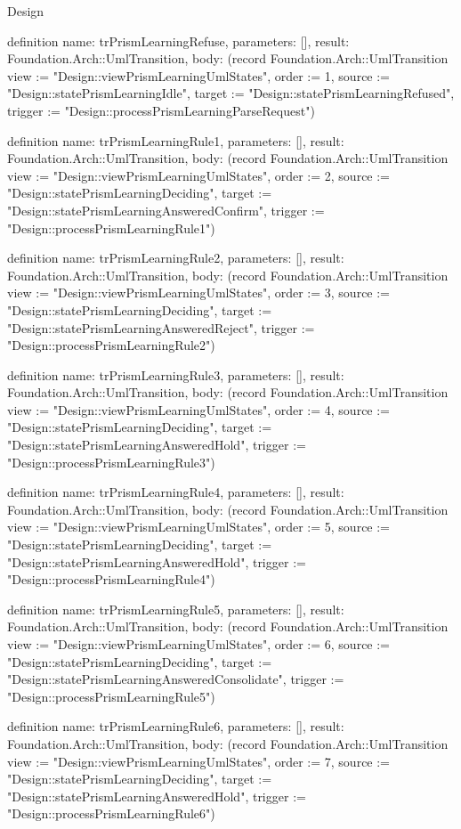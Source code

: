 \begin{lexlean}{Design}
\begin{semanticmodule}
definition{
  name: trPrismLearningRefuse,
  parameters: [],
  result: Foundation.Arch::UmlTransition,
  body: (record Foundation.Arch::UmlTransition {view := "Design::viewPrismLearningUmlStates", order := 1, source := "Design::statePrismLearningIdle", target := "Design::statePrismLearningRefused", trigger := "Design::processPrismLearningParseRequest"})
}

definition{
  name: trPrismLearningRule1,
  parameters: [],
  result: Foundation.Arch::UmlTransition,
  body: (record Foundation.Arch::UmlTransition {view := "Design::viewPrismLearningUmlStates", order := 2, source := "Design::statePrismLearningDeciding", target := "Design::statePrismLearningAnsweredConfirm", trigger := "Design::processPrismLearningRule1"})
}

definition{
  name: trPrismLearningRule2,
  parameters: [],
  result: Foundation.Arch::UmlTransition,
  body: (record Foundation.Arch::UmlTransition {view := "Design::viewPrismLearningUmlStates", order := 3, source := "Design::statePrismLearningDeciding", target := "Design::statePrismLearningAnsweredReject", trigger := "Design::processPrismLearningRule2"})
}

definition{
  name: trPrismLearningRule3,
  parameters: [],
  result: Foundation.Arch::UmlTransition,
  body: (record Foundation.Arch::UmlTransition {view := "Design::viewPrismLearningUmlStates", order := 4, source := "Design::statePrismLearningDeciding", target := "Design::statePrismLearningAnsweredHold", trigger := "Design::processPrismLearningRule3"})
}

definition{
  name: trPrismLearningRule4,
  parameters: [],
  result: Foundation.Arch::UmlTransition,
  body: (record Foundation.Arch::UmlTransition {view := "Design::viewPrismLearningUmlStates", order := 5, source := "Design::statePrismLearningDeciding", target := "Design::statePrismLearningAnsweredHold", trigger := "Design::processPrismLearningRule4"})
}

definition{
  name: trPrismLearningRule5,
  parameters: [],
  result: Foundation.Arch::UmlTransition,
  body: (record Foundation.Arch::UmlTransition {view := "Design::viewPrismLearningUmlStates", order := 6, source := "Design::statePrismLearningDeciding", target := "Design::statePrismLearningAnsweredConsolidate", trigger := "Design::processPrismLearningRule5"})
}

definition{
  name: trPrismLearningRule6,
  parameters: [],
  result: Foundation.Arch::UmlTransition,
  body: (record Foundation.Arch::UmlTransition {view := "Design::viewPrismLearningUmlStates", order := 7, source := "Design::statePrismLearningDeciding", target := "Design::statePrismLearningAnsweredHold", trigger := "Design::processPrismLearningRule6"})
}


\end{semanticmodule}
\end{lexlean}

